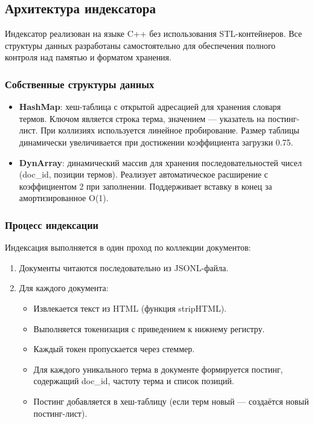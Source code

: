 \documentclass[a4paper,12pt]{article}
\begin{document}
\subsection{Архитектура индексатора}

Индексатор реализован на языке C++ без использования STL-контейнеров. Все структуры данных разработаны самостоятельно для обеспечения полного контроля над памятью и форматом хранения.

\subsubsection{Собственные структуры данных}

\begin{itemize}
    \item \textbf{HashMap}: хеш-таблица с открытой адресацией для хранения словаря термов. Ключом является строка терма, значением — указатель на постинг-лист. При коллизиях используется линейное пробирование. Размер таблицы динамически увеличивается при достижении коэффициента загрузки 0.75.

    \item \textbf{DynArray}: динамический массив для хранения последовательностей чисел (doc\_id, позиции термов). Реализует автоматическое расширение с коэффициентом 2 при заполнении. Поддерживает вставку в конец за амортизированное O(1).
\end{itemize}

\subsubsection{Процесс индексации}

Индексация выполняется в один проход по коллекции документов:

\begin{enumerate}
    \item Документы читаются последовательно из JSONL-файла.
    \item Для каждого документа:
    \begin{itemize}
        \item Извлекается текст из HTML (функция stripHTML).
        \item Выполняется токенизация с приведением к нижнему регистру.
        \item Каждый токен пропускается через стеммер.
        \item Для каждого уникального терма в документе формируется постинг, содержащий doc\_id, частоту терма и список позиций.
        \item Постинг добавляется в хеш-таблицу (если терм новый — создаётся новый постинг-лист).
    \end{itemize}
\end{enumerate}
\end{document}
